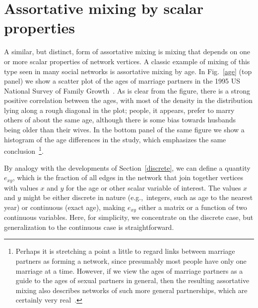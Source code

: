 \documentclass[twocolumn,pre]{revtex4}
\begin{document}
\section{Assortative mixing by scalar properties}
\label{scalar}
A similar, but distinct, form of assortative mixing is mixing that depends
on one or more scalar properties of network vertices.  A classic example of
mixing of this type seen in many social networks is assortative mixing by
age.  In Fig.~\ref{age} (top panel) we show a scatter plot of the ages of
marriage partners in the 1995 US National Survey of Family
Growth~\cite{NSFG97}.  As is clear from the figure, there is a strong
positive correlation between the ages, with most of the density in the
distribution lying along a rough diagonal in the plot; people, it appears,
prefer to marry others of about the same age, although there is some bias
towards husbands being older than their wives.  In the bottom panel of the
same figure we show a histogram of the age differences in the study, which
emphasizes the same conclusion~\footnote{Perhaps it is stretching a point a
little to regard links between marriage partners as forming a network,
since presumably most people have only one marriage at a time.  However, if
we view the ages of marriage partners as a guide to the ages of sexual
partners in general, then the resulting assortative mixing also describes
networks of such more general partnerships, which are certainly very
real~\cite{GAM89,Morris95,Liljeros01,BMS02}.}.

By analogy with the developments of Section~\ref{discrete}, we can define a
quantity $e_{xy}$, which is the fraction of all edges in the network that
join together vertices with values $x$ and $y$ for the age or other scalar
variable of interest.  The values $x$ and $y$ might be either discrete in
nature (e.g.,~integers, such as age to the nearest year) or continuous
(exact age), making $e_{xy}$ either a matrix or a function of two
continuous variables.  Here, for simplicity, we concentrate on the discrete
case, but generalization to the continuous case is straightforward.
\end{document}
